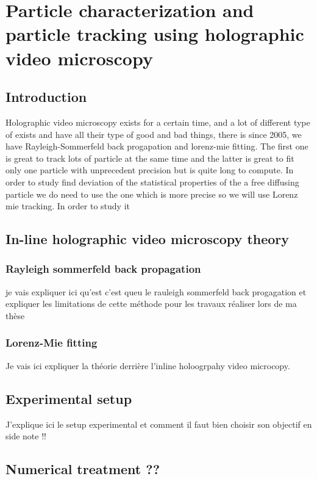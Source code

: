 \newpage
\section{Particle characterization and particle tracking using holographic video microscopy}
		\label{sec:chapter2}

\subsection{Introduction}


Holographic video microscopy exists for a certain time, and a lot of different type of exists and have all their type of good and bad things, there is since 2005, we have Rayleigh-Sommerfeld back progapation and lorenz-mie fitting. The first one is great to track lots of particle at the same time and the latter is great to fit only one particle with unprecedent precision but is quite long to compute. 
In order to study find deviation of the statistical properties of the a free diffusing particle we do need to use the one which is more precise so we will use Lorenz mie tracking. In order to study it 

\subsection{In-line holographic video microscopy theory}

\subsubsection{Rayleigh sommerfeld back propagation}
je vais expliquer ici qu'est c'est queu le rauleigh sommerfeld back progagation et expliquer les limitations de cette méthode pour les travaux réaliser lors de ma thèse
\subsubsection{Lorenz-Mie fitting}
Je vais ici expliquer la théorie derrière l'inline holoogrpahy video microcopy.

\subsection{Experimental setup}
J'explique ici le setup experimental et comment il faut bien choisir son objectif en side note !!

\subsection{Numerical treatment ??}

